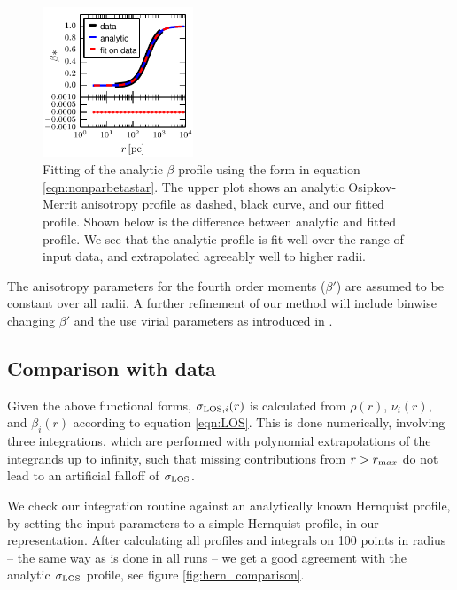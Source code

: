 \begin{figure}
    \begin{center}
        \hspace{-7mm}
        \includegraphics[width=0.4\textwidth]{fig/beta_fit_all.pdf}
        \caption{Fitting of the analytic $\beta$ profile using the form in
          equation \ref{eqn:nonparbetastar}. The upper plot shows an analytic
          Osipkov-Merrit anisotropy profile as dashed, black curve, and our
          fitted profile. Shown below is the difference between analytic and
          fitted profile. We see that the analytic profile is fit well over the
          range of input data, and extrapolated agreeably well to higher radii.}
        \label{fig:betafitting}
    \end{center}
\end{figure}

The anisotropy parameters for the fourth order moments ($\beta'$) are assumed to
be constant over all radii. A further refinement of our method will include
binwise changing $\beta'$ and the use virial parameters as introduced in
\cite{RichardsonFairbairn2014}.

\subsection{Comparison with data}\label{sec:datacompare}

Given the above functional forms, $\sigma_{\text{LOS},i}(r)$ is calculated from $\rho(r)$,
$\nu_i(r)$, and $\beta_i(r)$ according to equation \ref{eqn:LOS}. This is done
numerically, involving three integrations, which are performed with polynomial
extrapolations of the integrands up to infinity, such that missing contributions
from $r>r_{\text max}$ do not lead to an artificial falloff of $\sigma_{\text{LOS}}$.

We check our integration routine against an analytically known
Hernquist profile, by setting the input parameters to a simple
Hernquist profile, in our representation. After calculating all
profiles and integrals on 100 points in radius -- the same way as is
done in all runs -- we get a good agreement with the analytic
$\sigma_{\text{LOS}}$ profile, see figure \ref{fig:hern_comparison}.

